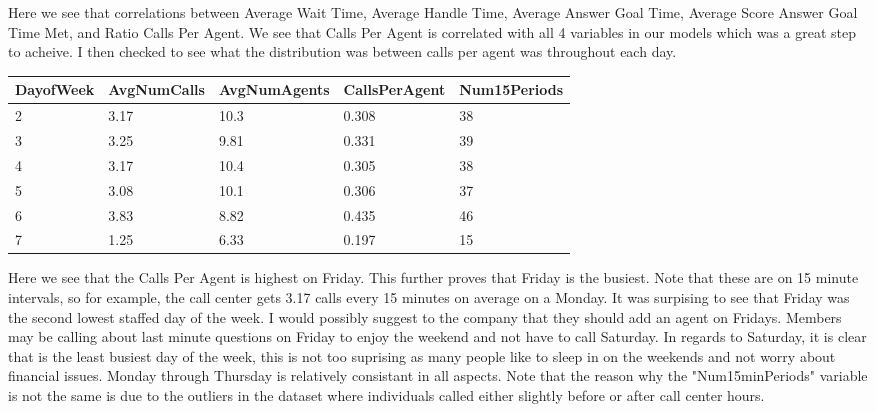 \documentclass[12pt]{article}
\begin{document}
Here we see that correlations between Average Wait Time, Average Handle Time, Average Answer Goal Time, Average Score Answer Goal Time Met, and Ratio Calls Per Agent.
We see that Calls Per Agent is correlated with all 4 variables in our models which was a great step to acheive. I then checked to see what the distribution was between calls per agent was throughout each day. 
  \begin{table}[H]
    \resizebox{\textwidth}{!} {
    \begin{tabular}{ l | l | l | l | l |}
      {\bf DayofWeek} & {\bf AvgNumCalls} & {\bf AvgNumAgents} & {\bf CallsPerAgent} & {\bf Num15Periods} \\
    \hline
    2 & 3.17 & 10.3 & 0.308 & 38 \\
    \hline
    3 & 3.25 & 9.81 & 0.331 & 39 \\
    \hline
    4 & 3.17 & 10.4 & 0.305 & 38 \\
    \hline
    5 & 3.08 & 10.1 & 0.306 & 37 \\
    \hline
    6 & 3.83 & 8.82 & 0.435 & 46 \\
    \hline
    7 & 1.25 & 6.33  & 0.197 & 15 \\
    \end{tabular}
    }
    \end{table}
Here we see that the Calls Per Agent is highest on Friday. This further proves that Friday is the busiest. Note that these are on 15 minute intervals,
so for example, the call center gets 3.17 calls every 15 minutes on average on a Monday. It was surpising to see that Friday was the second
lowest staffed day of the week. I would possibly suggest to the company that they should add an agent on Fridays. Members may be calling about last minute
questions on Friday to enjoy the weekend and not have to call Saturday. In regards to Saturday, it is clear that is the least busiest day of the week,
this is not too suprising as many people like to sleep in on the weekends and not worry about financial issues. Monday through Thursday is relatively
consistant in all aspects. Note that the reason why the "Num15minPeriods" variable is not the same is due to the outliers in the dataset where individuals
called either slightly before or after call center hours.
\end{document}
